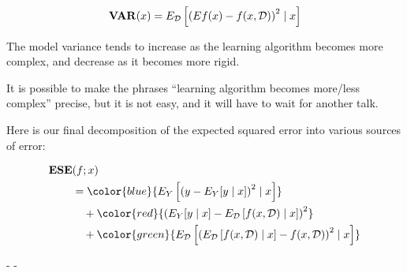 %
%
\begin{frame}
  \begin{align*}
    \operatorname*{\mathbf{VAR}}(x) = E_{\operatorname*{\mathcal{D}}} \left[ \left( Ef(x) - f(x,\operatorname*{\mathcal{D}}) \right)^2 \mid x \right]
  \end{align*}

  The model variance tends to increase as the learning algorithm becomes more
  complex, and decrease as it becomes more rigid.
\end{frame}
%
%
\begin{frame}
  It is possible to make the phrases ``learning algorithm becomes more/less complex''
  precise, but it is not easy, and it will have to wait for another talk.
\end{frame}
%
%
\begin{frame}
  Here is our final decomposition of the expected squared error into various
  sources of error:

  \begin{align*}
    \ESE & (f; x) \\
    &= \color{blue}{ 
         E_Y \left[ \left( y - E_Y[y \mid x] \right)^2 \mid x \right] } \\
       & \quad + \color{red}{
         \left( E_Y[y \mid x] -  E_{\D} \left[ f(x, \D) \mid x \right] \right)^2
       } \\
       & \quad + \color{green}{
         E_{\D} \left[ \left( E_{\D} \left[ f(x, \D) \mid x \right] - 
         f(x,\D) \right)^2 \mid x \right]
       }
  \end{align*}
  \begin{center}
    \color{blue}{Irreducible Error} - \color{red}{Model Bias} - \color{green}{Model
    Variance}
  \end{center}
\end{frame}

